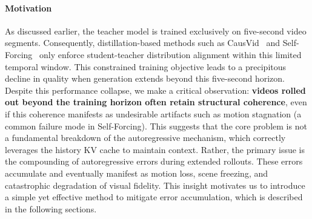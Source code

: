\paragraph{Motivation}
As discussed earlier, the teacher model is trained exclusively on five-second video segments. Consequently, distillation-based methods such as CausVid~\citep{yin2025causvid} and Self-Forcing~\citep{huang2025self} only enforce student-teacher distribution alignment within this limited temporal window. This constrained training objective leads to a precipitous decline in quality when generation extends beyond this five-second horizon.
Despite this performance collapse, we make a critical observation: \textbf{videos rolled out beyond the training horizon often retain structural coherence}, even if this coherence manifests as undesirable artifacts such as motion stagnation (a common failure mode in Self-Forcing). This suggests that the core problem is not a fundamental breakdown of the autoregressive mechanism, which correctly leverages the history KV cache to maintain context. Rather, the primary issue is the compounding of autoregressive errors during extended rollouts. These errors accumulate and eventually manifest as motion loss, scene freezing, and catastrophic degradation of visual fidelity. This insight motivates us to introduce a simple yet effective method to mitigate error accumulation, which is described in the following sections.

